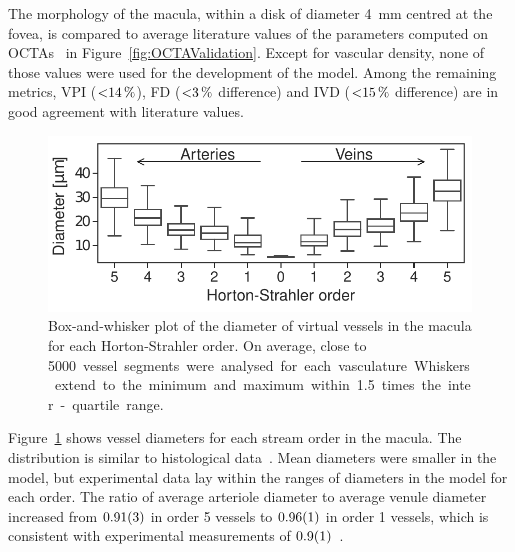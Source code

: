 \documentclass[11pt,]{article}
\begin{document}
The morphology of the macula, within a disk of diameter \SI{4}{\mm} centred at the fovea, is compared to average literature values of the parameters computed on OCTAs~\cite{Chu2016,Liu_2021,Ma2021} in Figure~\ref{fig:OCTAValidation}.
Except for vascular density, none of those values were used for the development of the model.
Among the remaining metrics, VPI ($\SI{<14}{\percent}$), FD ($\SI{<3}{\percent}$ difference) and IVD ($\SI{<15}{\percent}$ difference) are in good agreement with literature values.

\begin{figure}[ht!]
  \centering
  \includegraphics[width=.95\textwidth]{Horton_Strahler_Diameter_Distribution}
  \caption{\label{fig:Horton_Strahler}Box-and-whisker plot of the diameter of virtual vessels in the macula for each Horton-Strahler order. On average, close to \SI{5000} vessel segments were analysed for each vasculature. Whiskers extend to the minimum and maximum within \SI{1.5}{} times the inter-quartile range.}  
\end{figure}

Figure~\ref{fig:Horton_Strahler} shows vessel diameters for each stream order in the macula.
The distribution is similar to histological data~\cite{An2020}.
Mean diameters were smaller in the model, but experimental data lay within the ranges of diameters in the model for each order.
The ratio of average arteriole diameter to average venule diameter increased from $\SI{0.91\pm 0.03}{}$
in order 5 vessels to $\SI{0.96\pm0.01}{}$ in order 1 vessels, which is consistent with experimental measurements of $\SI{0.9\pm0.1}{}$~\cite{Goldenberg2013}.  
\end{document}
